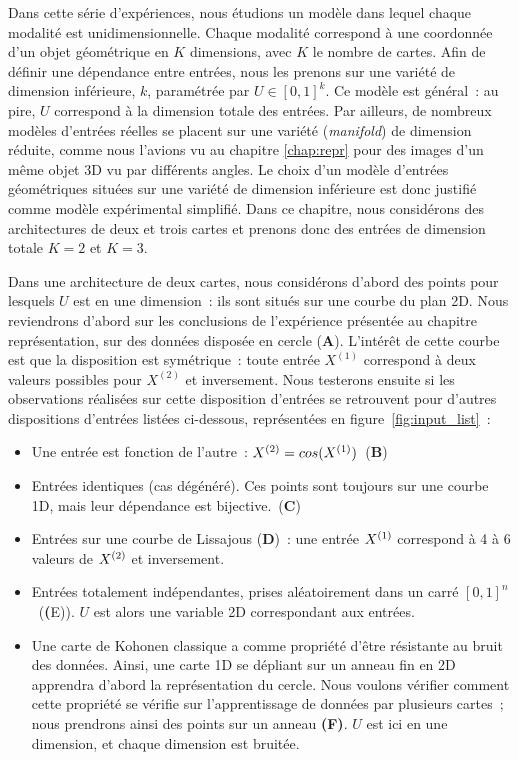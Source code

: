 \documentclass[../main]{subfiles}
\begin{document}
Dans cette série d'expériences, nous étudions un modèle dans lequel chaque modalité est unidimensionnelle. Chaque modalité correspond à une coordonnée d'un objet géométrique en $K$ dimensions, avec  $K$ le nombre de cartes. Afin de définir une dépendance entre entrées, nous les prenons sur une variété de dimension inférieure, $k$,  paramétrée par $U \in [0,1]^k$.
Ce modèle est général~: au pire, $U$ correspond à la dimension totale des entrées. 
Par ailleurs, de nombreux modèles d'entrées réelles se placent sur une variété (\emph{manifold}) de dimension réduite, comme nous l'avions vu au chapitre \ref{chap:repr} pour des images d'un même objet 3D vu par différents angles. Le choix d'un modèle d'entrées géométriques situées sur une variété de dimension inférieure est donc justifié comme modèle expérimental simplifié.
Dans ce chapitre, nous considérons des architectures de deux et trois cartes et prenons donc des entrées de dimension totale $K = 2$ et $K = 3$.

Dans une architecture de deux cartes, nous considérons d'abord des points pour lesquels $U$ est en une dimension~: ils sont situés sur une courbe du plan 2D.
Nous reviendrons d'abord  sur les conclusions de l'expérience présentée au chapitre représentation, sur des données disposée en cercle (\textbf{A}). L'intérêt de cette courbe est que la disposition est symétrique~: toute entrée $X^{(1)}$ correspond à deux valeurs possibles pour $X^{(2)}$ et inversement.
Nous testerons ensuite si les observations réalisées sur cette disposition d'entrées se retrouvent pour d'autres dispositions d'entrées listées ci-dessous, représentées en figure~\ref{fig:input_list}~:
\begin{itemize}
	\item Une entrée est fonction de l'autre~: $X^{({2})} = cos(X^{({1})})$~(\textbf{B})
	\item Entrées identiques (cas dégénéré). Ces points sont toujours sur une courbe 1D, mais leur dépendance est bijective.~(\textbf{C})
	\item Entrées sur une courbe de Lissajous (\textbf{D})~: une entrée $X^{({1})}$ correspond à 4 à 6 valeurs de $X^{({2})}$ et inversement.
	\item Entrées totalement indépendantes, prises aléatoirement dans un carré $[0,1]^n$~(\textbf({E})). $U$ est alors une variable 2D correspondant aux entrées.
	\item Une carte de Kohonen classique a comme propriété d'être résistante au bruit des données. Ainsi, une carte 1D se dépliant sur un anneau fin en 2D apprendra d'abord la représentation du cercle. Nous voulons vérifier comment cette propriété se vérifie sur l'apprentissage de données par plusieurs cartes~; nous prendrons ainsi des points sur un anneau \textbf{(F)}. $U$ est ici en une dimension, et chaque dimension est bruitée.
\end{itemize}
\end{document}
